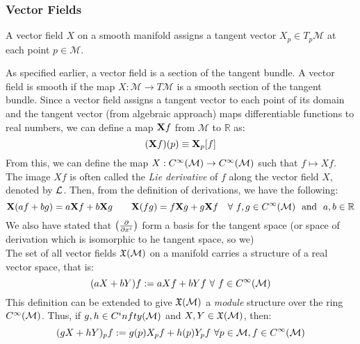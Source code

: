 \subsubsection{Vector Fields}
\begin{definition}
  A vector field $X$ on a smooth manifold assigns a tangent vector $X_p\in T_p\mathcal{M}$ at each point $p\in \mathcal{M}$.
\end{definition}
As specified earlier, a vector field is a section of the tangent bundle. A vector field is smooth if the map $X: \mathcal{M}\rightarrow T\mathcal{M}$ is a smooth section of the tangent bundle. Since a vector field assigns a tangent vector to each point of its domain and the tangent vector (from algebraic approach) maps differentiable functions to real numbers, we can define a map $\boldsymbol{\mathbf{X}}f$ from $\mathcal{M}$ to $\mathbb{R}$ as: 
$$(\boldsymbol{\mathbf{X}}f)(p) \equiv\boldsymbol{\mathbf{X}}_p[f]$$
From this, we can define the map $X: C^\infty(\mathcal M) \rightarrow C^\infty(\mathcal M)$ such that $f\mapsto Xf$. The image $Xf$ is often called the \textit{Lie derivative} of $f$ along the vector field $X$, denoted by $\mathcal L$. 
Then, from the definition of derivations, we have the following:
$$\boldsymbol{\mathbf{X}}(af+bg)=a\boldsymbol{\mathbf{X}}f + b\boldsymbol{\mathbf{X}}g \quad \quad \boldsymbol{\mathbf{X}}(fg) = f\boldsymbol{\mathbf{X}}g + g\boldsymbol{\mathbf{X}}f\quad \forall \ f,g \in C^\infty(\mathcal{M}) \ \ \text{and}\ \ a,b\in\mathbb{R}$$
We also have stated that $\left( \pdv{x^i} \right)$ form a basis for the tangent space (or space of derivation which is isomorphic to he tangent space, so we)\\[0.3cm]
The set of all vector fields $\mathfrak{X}(\mathcal M)$ on a manifold carries a structure of a real vector space, that is:
$$(aX+bY)f := aXf + bYf \ \forall \ f \in C^\infty(\mathcal M)$$
This definition can be extended to give $\mathfrak{X}(\mathcal M)$ a \textit{module} structure over the ring $C^\infty(\mathcal M)$. Thus, if $g,h \in C^infty(\mathcal M)$ and $X,Y\in \mathfrak{X}(\mathcal M)$, then:
$$(gX+hY)_p f:= g(p)X_pf + h(p)Y_pf\ \forall p\in\mathcal M, f \in C^\infty(\mathcal M)$$
